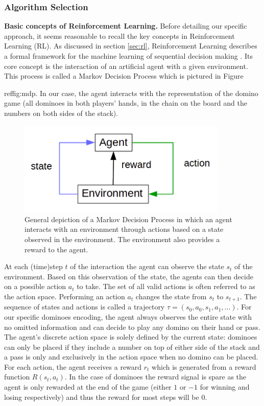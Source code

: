 \documentclass[12pt,a4paper]{article}
\begin{document}
\subsubsection{Algorithm Selection}
\textbf{Basic concepts of Reinforcement Learning.}
Before detailing our specific approach, it seems reasonable to recall the key concepts in Reinforcement Learning (RL). As discussed in section \ref{sec:rl}, Reinforcement Learning describes a formal framework for the machine learning of sequential decision making \citep{francois-lavet_introduction_2018}. Its core concept is the interaction of an artificial agent with a given environment. This process is called a Markov Decision Process which is pictured in Figure {ref{fig:mdp}. In our case, the agent interacts with the representation of the domino game (all dominoes in both players' hands, in the chain on the board and the numbers on both sides of the stack).

\begin{figure}
  \includegraphics[width=10cm]{img/mdp.png}
  \centering 
  \caption{General depiction of a Markov Decision Process in which an agent interacts with an environment through actions based on a state observed in the environment. The environment also provides a reward to the agent.}
  \label{fig:mdp}
 
\end{figure}

At each (time)step $t$ of the interaction the agent can observe the state $s_t$ of the environment. Based on this observation of the state, the agents can then decide on a possible action $a_t$ to take. The set of all valid actions is often referred to as the action space. Performing an action $a_t$ changes the state from $s_t$ to $s_{t+1}$. The sequence of states and actions is called a trajectory $\tau = (s_0, a_0, s_1, a_1, …)$. For our specific dominoes encoding, the agent always observes the entire state with no omitted information and can decide to play any domino on their hand or pass. The agent’s discrete action space is solely defined by the current state: dominoes can only be placed if they include a number on top of either side of the stack and a pass is only and exclusively in the action space when no domino can be placed. 
For each action, the agent receives a reward $r_t$ which is generated from a reward function $R(s_t, a_t)$. In the case of dominoes the reward signal is spare as the agent is only rewarded at the end of the game (either $1$ or $-1$ for winning and losing respectively) and thus the reward for most steps will be $0$. 

}
\end{document}
